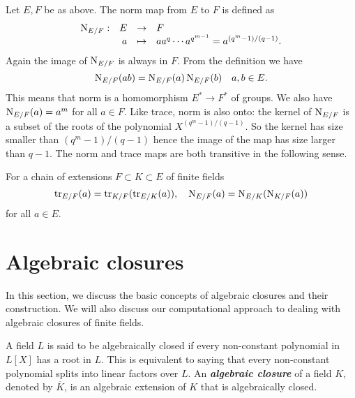Let $E, F$ be as above. The norm map from $E$ to $F$ is defined 
as
\[
\begin{array}{lrll}
\operatorname{N}_{E/F}: & E & \rightarrow & F \\
& a & \mapsto & aa^q \cdots a^{q^{m - 1}} = a^{(q^m - 1) / (q - 1)}.
\end{array}
\]
Again the image of $\operatorname{N}_{E/F}$ is always in $F$. From the definition we have 
\[ \operatorname{N}_{E/F}(ab) = \operatorname{N}_{E/F}(a)\operatorname{N}_{E/F}(b) \quad a,b \in E. \]
This means that norm is a homomorphism $E^* \rightarrow F^*$ of groups. We also have 
$\operatorname{N}_{E/F}(a) = a^m$ for all $a \in F$. Like trace, norm is also onto: the kernel of 
$\operatorname{N}_{E/F}$ is a subset of the roots of the polynomial $X^{(q^m - 1) / (q - 1)}$. So the kernel 
has size smaller than $(q^m - 1) / (q - 1)$ hence the image of the map has size larger 
than $q - 1$. The norm and trace maps are both transitive in the following sense.

\begin{result}
	For a chain of extensions $F \subset K \subset E$ of finite fields
	\[ \operatorname{tr}_{E/F}(a) = \operatorname{tr}_{K/F}(\operatorname{tr}_{E/K}(a)), \quad \operatorname{N}_{E/F}(a) = 
	\operatorname{N}_{E/K}(\operatorname{N}_{K/F}(a)) \]
	for all $a \in E$.
\end{result}

\section{Algebraic closures}

In this section, we discuss the basic concepts of algebraic closures and their construction. We 
will also discuss our computational approach to dealing with algebraic closures of finite fields.

A field $L$ is said to be algebraically closed if every non-constant polynomial in $L[X]$ has a 
root in $L$. This is equivalent to saying that every non-constant polynomial splits into linear 
factors over $L$. An \textit{\textbf{algebraic closure}} of a field $K$, denoted by $\overline{K}$, 
is an algebraic extension of $K$ that is algebraically closed.

